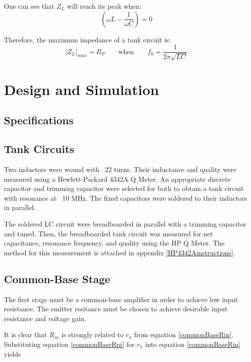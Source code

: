 \documentclass[titlepage, letterpaper, 11pt]{article}
\begin{document}
One can see that $Z_{L}$ will reach its peak when:
\begin{equation*}
\left(\omega L-\frac{1}{\omega C}\right)=0
\end{equation*}

Therefore, the maximum impedance of a tank circuit is:
\begin{equation}
|Z_{L}|_{max}=R_{P}\qquad\textrm{when}\qquad
f_{0}=\frac{1}{2\pi\sqrt{LC}}
\end{equation}

\section{Design and Simulation}

\subsection{Specifications}

\subsection{Tank Circuits}

Two inductors were wound with ~22 turns. Their inductance and quality
were measured using a Hewlett-Packard 4342A Q Meter. An appropriate
discrete capacitor and trimming capacitor were selected for both to
obtain a tank circuit with resonance at ~10 MHz. The fixed capacitors
were soldered to their inductors in parallel.



The soldered LC circuit were breadboarded in parallel with a trimming
capacitor and tuned. Then, the breadboarded tank circuit was measured
for net capacitance, resonance frequency, and quality using the HP
Q Meter. The method for this measurement is attached in appendix
\ref{HP4342Ainstructions}.

\subsection{Common-Base Stage}

The first stage must be a common-base amplifier in order to achieve
low input resistance. The emitter resitance must be
chosen to achieve desirable input resistance and voltage gain.

It is clear that $R_{in}$ is strongly related to $r_{\pi}$ from
equation \ref{commonBaseRin}. Substituting equation
\ref{commonBaseRpi} for $r_{\pi}$ into equation \ref{commonBaseRin}
yields
\end{document}
